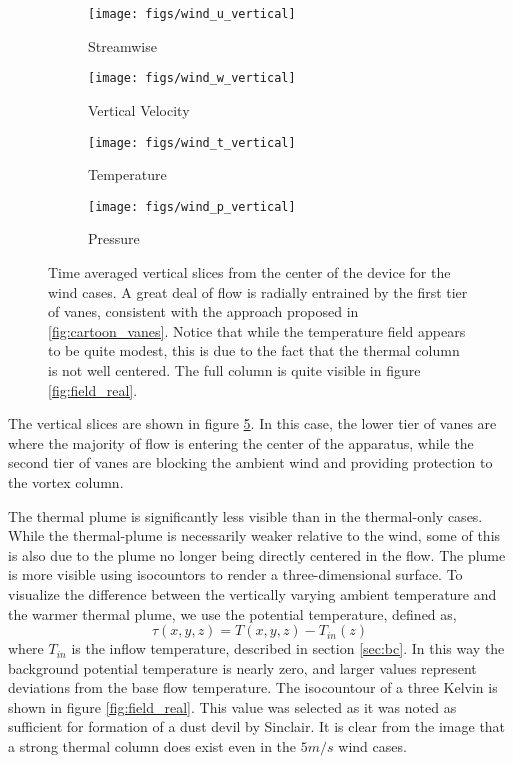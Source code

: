 %
%

\begin{figure}[htb]

 \begin{subfigure}{.5\textwidth}
  \centering
  \texttt{[image: figs/wind\_u\_vertical]}
  \caption{Streamwise}
  \label{fig:vt-wind-vert}
 \end{subfigure}%
 \begin{subfigure}{.5\textwidth}
  \centering
  \texttt{[image: figs/wind\_w\_vertical]}
  \caption{Vertical Velocity}
  \label{fig:vz-wind-vert}
 \end{subfigure}%


 \begin{subfigure}{.5\textwidth}
  \centering
  \texttt{[image: figs/wind\_t\_vertical]}
  \caption{Temperature}
  \label{fig:t-wind-vert}
 \end{subfigure}%
 \begin{subfigure}{.5\textwidth}
  \centering
  \texttt{[image: figs/wind\_p\_vertical]}
  \caption{Pressure}
  \label{fig:p-wind-vert}
 \end{subfigure}%

 \caption{Time averaged vertical slices from the center of the device
 for the wind cases. A great deal of flow is radially entrained by the
 first tier of vanes, consistent with the approach proposed in
 \ref{fig:cartoon_vanes}. 
 Notice that while the temperature field appears to
 be quite modest, this is due to the fact that the thermal column is not
 well centered. The full column is quite visible in figure
 \ref{fig:field_real}.}  
 \label{fig:wind-ver}
\end{figure}

The vertical slices are shown in figure \ref{fig:wind-ver}. In this
case, the lower tier of vanes are where the majority of flow is 
entering the center of the apparatus, while the second tier of vanes are
blocking the ambient wind and providing protection to the vortex column. 

The thermal plume is significantly less
visible than in the thermal-only cases. While the
thermal-plume is necessarily weaker relative to the wind, some of this
is also due to the plume no longer being directly centered in the
flow. The plume is more visible using isocountors to render a
three-dimensional surface. 
To visualize the difference between the vertically varying ambient temperature
and the warmer thermal plume, we use the potential temperature, defined
as, 
\begin{equation}
  \tau(x,y,z) = T(x,y,z) -T_{in}(z) 
   \label{eqn:tau}
\end{equation}
where $T_{in}$ is the inflow temperature, described
in section \ref{sec:bc}. In this way the background potential
temperature is nearly zero, and larger values represent deviations from
the base flow temperature. The isocountour of a three Kelvin is 
shown in figure \ref{fig:field_real}. This value was selected as
it was noted as sufficient for formation of a dust devil by
Sinclair\cite{Sinclair1969}. It is clear from the image that a 
strong thermal column does exist even in the $5 m/s$ wind cases. 

